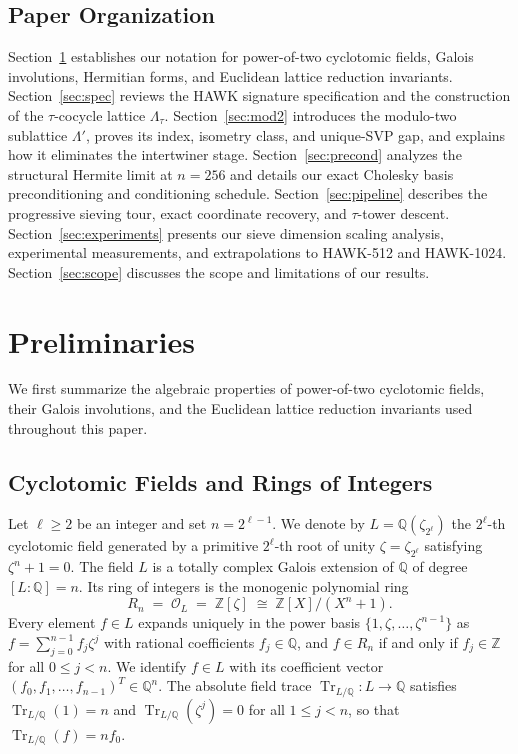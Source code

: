 \documentclass[11pt,a4paper]{article}
\theoremstyle{definition}
\newcommand{\Z}{\mathbb{Z}}
\newcommand{\Q}{\mathbb{Q}}
\newcommand{\OL}{\mathcal{O}_L}
\newcommand{\Lt}{\Lambda_\tau}
\newcommand{\Lp}{\Lambda'}
\newcommand{\Tr}{\operatorname{Tr}}
\begin{document}
\subsection{Paper Organization}
Section~\ref{sec:prelim} establishes our notation for power-of-two cyclotomic fields, Galois involutions, Hermitian forms, and Euclidean lattice reduction invariants. Section~\ref{sec:spec} reviews the HAWK signature specification and the construction of the $\tau$-cocycle lattice $\Lt$. Section~\ref{sec:mod2} introduces the modulo-two sublattice $\Lp$, proves its index, isometry class, and unique-SVP gap, and explains how it eliminates the intertwiner stage. Section~\ref{sec:precond} analyzes the structural Hermite limit at $n=256$ and details our exact Cholesky basis preconditioning and conditioning schedule. Section~\ref{sec:pipeline} describes the progressive sieving tour, exact coordinate recovery, and $\tau$-tower descent. Section~\ref{sec:experiments} presents our sieve dimension scaling analysis, experimental measurements, and extrapolations to HAWK-512 and HAWK-1024. Section~\ref{sec:scope} discusses the scope and limitations of our results.

\section{Preliminaries}
\label{sec:prelim}

We first summarize the algebraic properties of power-of-two cyclotomic fields, their Galois involutions, and the Euclidean lattice reduction invariants used throughout this paper.

\subsection{Cyclotomic Fields and Rings of Integers}
Let $\ell \ge 2$ be an integer and set $n = 2^{\ell-1}$. We denote by $L = \Q(\zeta_{2^\ell})$ the $2^\ell$-th cyclotomic field generated by a primitive $2^\ell$-th root of unity $\zeta = \zeta_{2^\ell}$ satisfying $\zeta^n + 1 = 0$. The field $L$ is a totally complex Galois extension of $\Q$ of degree $[L:\Q] = n$. Its ring of integers is the monogenic polynomial ring
\[
  R_n \;=\; \OL \;=\; \Z[\zeta] \;\cong\; \Z[X]/(X^n + 1).
\]
Every element $f \in L$ expands uniquely in the power basis $\{1, \zeta, \dots, \zeta^{n-1}\}$ as $f = \sum_{j=0}^{n-1} f_j \zeta^j$ with rational coefficients $f_j \in \Q$, and $f \in R_n$ if and only if $f_j \in \Z$ for all $0 \le j < n$. We identify $f \in L$ with its coefficient vector $(f_0, f_1, \dots, f_{n-1})^T \in \Q^n$. The absolute field trace $\Tr_{L/\Q}: L \to \Q$ satisfies $\Tr_{L/\Q}(1) = n$ and $\Tr_{L/\Q}(\zeta^j) = 0$ for all $1 \le j < n$, so that $\Tr_{L/\Q}(f) = n f_0$.
\end{document}

